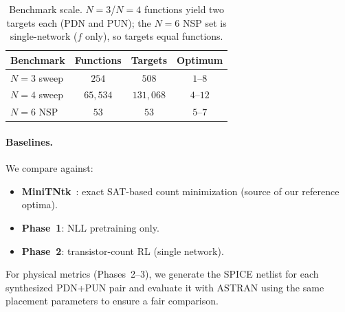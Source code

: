 \begin{table}[t]
\centering
\caption{Benchmark scale. $N{=}3$/$N{=}4$ functions yield two targets each
         (PDN and PUN); the $N{=}6$ NSP set is single-network ($f$ only), so
         targets equal functions.}
\label{tab:datasets}
\begin{tabular}{lccc}
\toprule
\textbf{Benchmark} & \textbf{Functions} & \textbf{Targets} & \textbf{Optimum} \\
\midrule
$N=3$ sweep      & $254$    & $508$     & $1$--$8$ \\
$N=4$ sweep      & $65{,}534$ & $131{,}068$ & $4$--$12$ \\
$N=6$ NSP        & $53$     & $53$      & $5$--$7$ \\
\bottomrule
\end{tabular}
\end{table}

\paragraph{Baselines.}
We compare against:
\begin{itemize}[leftmargin=*, topsep=2pt, itemsep=0pt]
  \item \textbf{MiniTNtk}~\cite{miniTNtk}: exact SAT-based count
        minimization (source of our reference optima).
  \item \textbf{\method{} Phase~1}: NLL pretraining only.
  \item \textbf{\method{} Phase~2}: transistor-count RL (single network).
\end{itemize}
For physical metrics (Phases~2--3), we generate the SPICE netlist for
each synthesized PDN+PUN pair and evaluate it with ASTRAN using the same
placement parameters to ensure a fair comparison.


